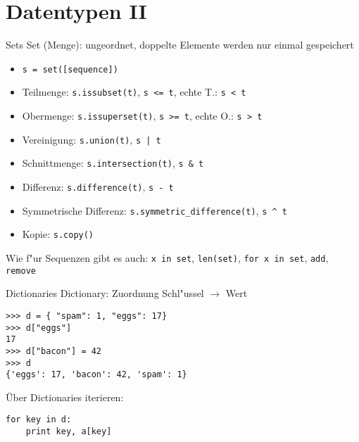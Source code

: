 \section{Datentypen II}

\begin{frame}[fragile]{Sets}
\alert{Set} (Menge): ungeordnet, doppelte Elemente werden nur einmal gespeichert
\begin{itemize}
\item \lstinline{s = set([sequence])}
\item \alert{Teilmenge}: \lstinline{s.issubset(t)}, \lstinline{s <= t}, echte T.: \lstinline{s < t}
\item \alert{Obermenge}: \lstinline{s.issuperset(t)}, \lstinline{s >= t}, echte O.: \lstinline{s > t} 
\item \alert{Vereinigung}: \lstinline{s.union(t)}, \lstinline{s | t}
\item \alert{Schnittmenge}: \lstinline{s.intersection(t)}, \lstinline{s & t}
\item \alert{Differenz}: \lstinline{s.difference(t)}, \lstinline{s - t}
\item Symmetrische Differenz: \lstinline{s.symmetric_difference(t)}, \lstinline{s ^ t}
\item Kopie: \lstinline{s.copy()}
\end{itemize}
Wie f"ur Sequenzen gibt es auch: \lstinline{x in set}, \lstinline{len(set)}, \lstinline{for x in set}, \lstinline{add}, \lstinline{remove}
\end{frame}

\begin{frame}[fragile]{Dictionaries}
\alert{Dictionary}: Zuordnung Schl"ussel $\rightarrow$ Wert
\begin{lstlisting}[style=Shell]
>>> d = { "spam": 1, "eggs": 17}
>>> d["eggs"]
17
>>> d["bacon"] = 42
>>> d
{'eggs': 17, 'bacon': 42, 'spam': 1}
\end{lstlisting}
\"Uber Dictionaries iterieren:
\begin{lstlisting}[style=Python]
for key in d:
    print key, a[key]
\end{lstlisting}
\end{frame}

